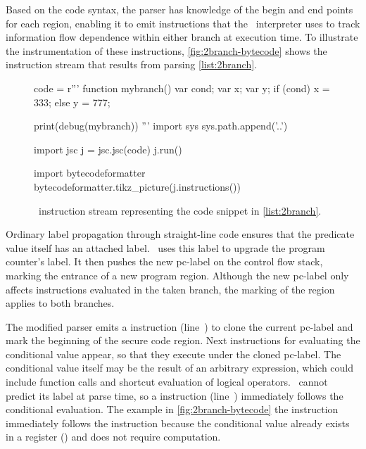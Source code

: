 Based on the code syntax, the parser has knowledge of the begin and end points for each region, enabling it to emit instructions that the \FlowCore\ interpreter uses to track information flow dependence within either branch at execution time.
To illustrate the instrumentation of these instructions, \autoref{fig:2branch-bytecode} shows the instruction stream that results from parsing \autoref{list:2branch}.

\begin{figure}[h]
\begin{python}
code = r'''
function mybranch() {
  var cond;
  var x;
  var y;
  if (cond) {
    x = 333;
  } else {
    y = 777;
  }
}

print(debug(mybranch))
'''
import sys
sys.path.append('..')

import jsc
j = jsc.jsc(code)
j.run()

import bytecodeformatter
bytecodeformatter.tikz_picture(j.instructions())
\end{python}
  \caption{\FlowCore\ instruction stream representing the code snippet in \autoref{list:2branch}.}
  \label{fig:2branch-bytecode}
\end{figure}

Ordinary label propagation through straight-line code ensures that the predicate value itself has an attached label.
\FlowCore\ uses this label to upgrade the program counter's label.
It then pushes the new pc-label on the control flow stack, marking the entrance of a new program region.
Although the new pc-label only affects instructions evaluated in the taken branch, the marking of the region applies to both branches.

The modified parser emits a \dup instruction (line~) to clone the current pc-label and mark the beginning of the secure code region.
Next instructions for evaluating the conditional value appear, so that they execute under the cloned pc-label.
The conditional value itself may be the result of an arbitrary expression, which could include function calls and shortcut evaluation of logical operators.
\FlowCore\ cannot predict its label at parse time, so a \join instruction (line~) immediately follows the conditional evaluation.
The example in \autoref{fig:2branch-bytecode} the \join instruction immediately follows the \dup instruction because the conditional value already exists in a register () and does not require computation.

